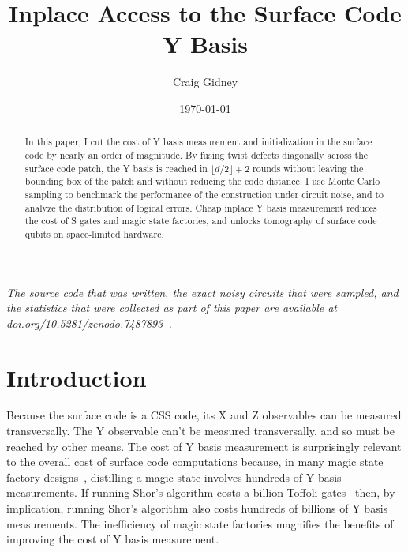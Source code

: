 \documentclass[onecolumn,unpublished,a4paper]{quantumarticle}
\theoremstyle{definition}
\theoremstyle{definition}
\theoremstyle{definition}
\begin{document}
\title{Inplace Access to the Surface Code Y Basis}

\date{\today}
\author{Craig Gidney}

\begin{abstract}
In this paper, I cut the cost of Y basis measurement and initialization in the surface code by nearly an order of magnitude.
By fusing twist defects diagonally across the surface code patch, the Y basis is reached in $\lfloor d/2 \rfloor + 2$ rounds without leaving the bounding box of the patch and without reducing the code distance.
I use Monte Carlo sampling to benchmark the performance of the construction under circuit noise, and to analyze the distribution of logical errors.
Cheap inplace Y basis measurement reduces the cost of S gates and magic state factories, and unlocks tomography of surface code qubits on space-limited hardware.
\end{abstract}

\emph{The source code that was written, the exact noisy circuits that were sampled, and the statistics that were collected as part of this paper are available at \href{https://doi.org/10.5281/zenodo.7487893}{doi.org/10.5281/zenodo.7487893}~\cite{gidneyybasisdata2022}.}

\maketitle

\section{Introduction}
\label{sec:introduction}

Because the surface code is a CSS code, its X and Z observables can be measured transversally.
The Y observable can't be measured transversally, and so must be reached by other means.
The cost of Y basis measurement is surprisingly relevant to the overall cost of surface code computations because, in many magic state factory designs~\cite{fowler2018latticesurgery,gidney2019catalyzeddistillation,litinski2018}, distilling a magic state involves hundreds of Y basis measurements.
If running Shor's algorithm costs a billion Toffoli gates~\cite{gidney2017factoring,soeken2020improved} then, by implication, running Shor's algorithm also costs hundreds of billions of Y basis measurements.
The inefficiency of magic state factories magnifies the benefits of improving the cost of Y basis measurement.
\end{document}

